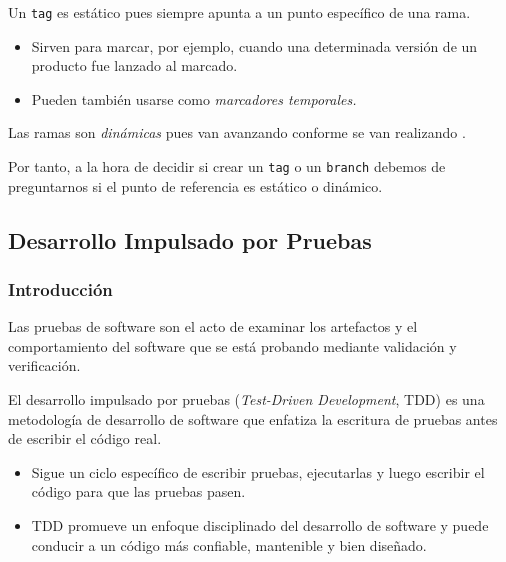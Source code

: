 Un \texttt{tag} es estático pues siempre apunta a un punto específico de una rama. 
\begin{itemize}
\item Sirven para marcar, por ejemplo, cuando una determinada versión de un producto fue lanzado al marcado.
\item Pueden también usarse como \textit{marcadores temporales.}
\end{itemize}
Las ramas son \textit{dinámicas} pues van avanzando conforme se van realizando .

Por tanto, a la hora de decidir si crear un \texttt{tag} o un \texttt{branch} debemos de preguntarnos si el punto de referencia es estático o dinámico.
\subsection{Desarrollo Impulsado por Pruebas}
\subsubsection{Introducción}
Las pruebas de software son el acto de examinar los artefactos y el comportamiento del software que se está probando mediante validación y verificación.

El desarrollo impulsado por pruebas (\textit{Test-Driven Development}, TDD) es una metodología de desarrollo de software que enfatiza la escritura de pruebas antes de escribir el código real. 

\begin{itemize}
\item Sigue un ciclo específico de escribir pruebas, ejecutarlas y luego escribir el código para que las pruebas pasen.
\item TDD promueve un enfoque disciplinado del desarrollo de software y puede conducir a un código más confiable, mantenible y bien diseñado.
\end{itemize}

